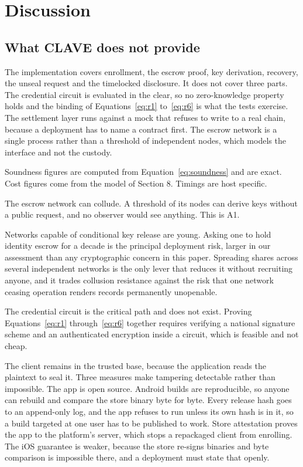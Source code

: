 \documentclass[11pt,a4paper]{article}
\begin{document}
\section{Discussion}

\subsection{What CLAVE does not provide}
\label{sec:limits}

The implementation covers enrollment, the escrow proof, key derivation,
recovery, the unseal request and the timelocked disclosure. It does not cover
three parts. The credential circuit is evaluated in the clear, so no
zero-knowledge property holds and the binding of Equations~\ref{eq:r1}
to~\ref{eq:r6} is what the tests exercise. The settlement layer runs against a
mock that refuses to write to a real chain, because a deployment has to name a
contract first. The escrow network is a single process rather than a threshold
of independent nodes, which models the interface and not the custody.

Soundness figures are computed from Equation~\ref{eq:soundness} and are exact.
Cost figures come from the model of Section 8. Timings are host specific.

The escrow network can collude. A threshold of its nodes can derive keys without
a public request, and no observer would see anything. This is A1.

Networks capable of conditional key release are young. Asking one to hold
identity escrow for a decade is the principal deployment risk, larger in our
assessment than any cryptographic concern in this paper. Spreading shares across
several independent networks is the only lever that reduces it without recruiting
anyone, and it trades collusion resistance against the risk that one network
ceasing operation renders records permanently unopenable.

The credential circuit is the critical path and does not exist. Proving
Equations~\ref{eq:r1} through~\ref{eq:r6} together requires verifying a national
signature scheme and an authenticated encryption inside a circuit, which is
feasible and not cheap.

The client remains in the trusted base, because the application reads the
plaintext to seal it. Three measures make tampering detectable rather than
impossible. The app is open source. Android builds are reproducible, so anyone
can rebuild and compare the store binary byte for byte. Every release hash goes
to an append-only log, and the app refuses to run unless its own hash is in it,
so a build targeted at one user has to be published to work. Store attestation
proves the app to the platform's server, which stops a repackaged client from
enrolling. The iOS guarantee is weaker, because the store re-signs binaries and
byte comparison is impossible there, and a deployment must state that openly.
\end{document}
